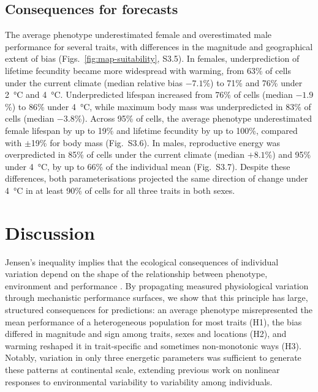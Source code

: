 \documentclass[12pt]{article}
\begin{document}
\subsection{Consequences for forecasts}

The average phenotype underestimated female and overestimated male performance for several traits, with differences in the magnitude and geographical extent of bias (Figs.~\ref{fig:map-suitability}, S3.5). In females, underprediction of lifetime fecundity became more widespread with warming, from 63\% of cells under the current climate (median relative bias $-7.1$\%) to 71\% and 76\% under \qty{+2}{\celsius} and \qty{+4}{\celsius}. Underpredicted lifespan increased from 76\% of cells (median $-1.9$\%) to 86\% under \qty{+4}{\celsius}, while maximum body mass was underpredicted in 83\% of cells (median $-3.8$\%). Across 95\% of cells, the average phenotype underestimated female lifespan by up to 19\% and lifetime fecundity by up to 100\%, compared with $\pm$19\% for body mass (Fig.~S3.6). In males, reproductive energy was overpredicted in 85\% of cells under the current climate (median $+8.1$\%) and 95\% under \qty{+4}{\celsius}, by up to 66\% of the individual mean (Fig.~S3.7). Despite these differences, both parameterisations projected the same direction of change under \qty{+4}{\celsius} in at least 90\% of cells for all three traits in both sexes.

\section{Discussion}

Jensen's inequality implies that the ecological consequences of individual variation depend on the shape of the relationship between phenotype, environment and performance \parencite{ruel1999,bolnick2011}. By propagating measured physiological variation through mechanistic performance surfaces, we show that this principle has large, structured consequences for predictions: an average phenotype misrepresented the mean performance of a heterogeneous population for most traits (H1), the bias differed in magnitude and sign among traits, sexes and locations (H2), and warming reshaped it in trait-specific and sometimes non-monotonic ways (H3). Notably, variation in only three energetic parameters was sufficient to generate these patterns at continental scale, extending previous work on nonlinear responses to environmental variability \parencite{paaijmans2013,denny2017} to variability among individuals.
\end{document}
